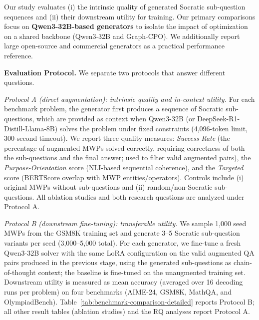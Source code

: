 \documentclass[sigconf, anonymous, review, screen]{acmart}
\newcommand{\ourmethod}{{Graph-CPO}}
\begin{document}
Our study evaluates (i) the intrinsic quality of generated Socratic sub-question sequences and (ii) their downstream utility for training. Our primary comparisons focus on \textbf{Qwen3-32B-based generators} to isolate the impact of optimization on a shared backbone (Qwen3-32B and \ourmethod). We additionally report large open-source and commercial generators as a practical performance reference.

\textbf{Evaluation Protocol.} We separate two protocols that answer different questions.

\emph{Protocol A (direct augmentation): intrinsic quality and in-context utility.} For each benchmark problem, the generator first produces a sequence of Socratic sub-questions, which are provided as context when Qwen3-32B (or DeepSeek-R1-Distill-Llama-8B) solves the problem under fixed constraints (4,096-token limit, 300-second timeout). We report three quality measures: \emph{Success Rate} (the percentage of augmented MWPs solved correctly, requiring correctness of both the sub-questions and the final answer; used to filter valid augmented pairs), the \emph{Purpose-Orientation} score (NLI-based sequential coherence), and the \emph{Targeted} score (BERTScore overlap with MWP entities/operators). Controls include (i) original MWPs without sub-questions and (ii) random/non-Socratic sub-questions. All ablation studies and both research questions are analyzed under Protocol A.

\emph{Protocol B (downstream fine-tuning): transferable utility.} We sample 1,000 seed MWPs from the GSM8K training set and generate 3--5 Socratic sub-question variants per seed (3,000--5,000 total). For each generator, we fine-tune a fresh Qwen3-32B solver with the same LoRA configuration on the valid augmented QA pairs produced in the previous stage, using the generated sub-questions as chain-of-thought context; the baseline is fine-tuned on the unaugmented training set. Downstream utility is measured as mean accuracy (averaged over 16 decoding runs per problem) on four benchmarks (AIME-24, GSM8K, MathQA, and OlympiadBench). Table~\ref{tab:benchmark-comparison-detailed} reports Protocol B; all other result tables (ablation studies) and the RQ analyses report Protocol A.
\end{document}
